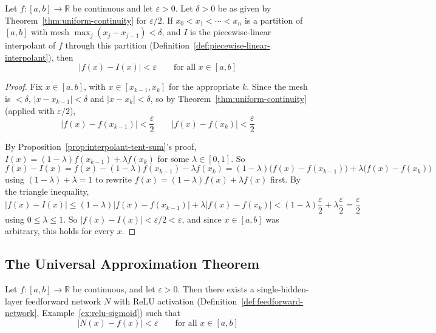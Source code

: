 		\begin{proposition}
			\label{prop:interpolation-error-bound}
			Let $f:[a,b]\to\mathbb{R}$ be continuous and let $\varepsilon>0$. Let $\delta>0$ be as given by Theorem~\ref{thm:uniform-continuity} for $\varepsilon/2$. If $x_0<x_1<\cdots<x_n$ is a partition of $[a,b]$ with mesh $\max_j(x_j-x_{j-1})<\delta$, and $I$ is the piecewise-linear interpolant of $f$ through this partition (Definition~\ref{def:piecewise-linear-interpolant}), then
			\[
				|f(x)-I(x)| < \varepsilon \qquad \text{for all } x\in[a,b]
			\]
		\end{proposition}
		
		\begin{proof}
			Fix $x\in[a,b]$, with $x\in[x_{k-1},x_k]$ for the appropriate $k$. Since the mesh is $<\delta$, $|x-x_{k-1}|<\delta$ and $|x-x_k|<\delta$, so by Theorem~\ref{thm:uniform-continuity} (applied with $\varepsilon/2$),
			\[
				|f(x)-f(x_{k-1})| < \frac{\varepsilon}{2} \qquad |f(x)-f(x_k)| < \frac{\varepsilon}{2}
			\]
			
			By Proposition~\ref{prop:interpolant-tent-sum}'s proof, $I(x) = (1-\lambda)f(x_{k-1}) + \lambda f(x_k)$ for some $\lambda\in[0,1]$. So
			\[
				f(x) - I(x) = f(x) - (1-\lambda)f(x_{k-1}) - \lambda f(x_k) = (1-\lambda)\big(f(x)-f(x_{k-1})\big) + \lambda\big(f(x)-f(x_k)\big)
			\]
			using $(1-\lambda)+\lambda=1$ to rewrite $f(x)=(1-\lambda)f(x)+\lambda f(x)$ first. By the triangle inequality,
			\[
				|f(x)-I(x)| \le (1-\lambda)|f(x)-f(x_{k-1})| + \lambda|f(x)-f(x_k)| < (1-\lambda)\frac{\varepsilon}{2} + \lambda\frac{\varepsilon}{2} = \frac{\varepsilon}{2}
			\]
			using $0\le\lambda\le1$. So $|f(x)-I(x)| < \varepsilon/2 < \varepsilon$, and since $x\in[a,b]$ was arbitrary, this holds for every $x$.
		\end{proof}
		
	\subsection{The Universal Approximation Theorem}
		
		\begin{theorem}
			\label{thm:uat-1d}
			Let $f:[a,b]\to\mathbb{R}$ be continuous, and let $\varepsilon>0$. Then there exists a single-hidden-layer feedforward network $N$ with ReLU activation (Definition~\ref{def:feedforward-network}, Example~\ref{ex:relu-sigmoid}) such that
			\[
				|N(x)-f(x)| < \varepsilon \qquad \text{for all } x\in[a,b]
			\]
		\end{theorem}
		
